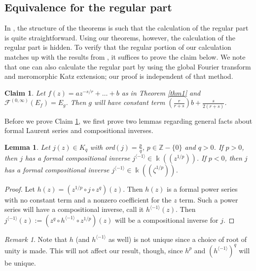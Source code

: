 \documentclass[11pt]{amsart}
\theoremstyle{plain}
\newtheorem{lemma}[theorem]{Lemma}
\newtheorem{claim}[theorem]{Claim}
\theoremstyle{definition}
\theoremstyle{remark}
\newtheorem*{remark}{Remark}
\def\d{\displaystyle}
\def\bigz{\mathbb{Z}}
\def\comp{\circ}
\begin{document}
\subsection{Equivalence for the regular part}\label{subsec equiv2}

In \cite{fang}, the structure of the theorems is such that the calculation of the regular part is quite straightforward.  Using our theorems, however, the calculation of the regular part is hidden. To verify that the regular portion of our calculation matches up with the results from \cite{fang}, it suffices to prove the claim below.  We note that one can also calculate the regular part by using the global Fourier transform and meromorphic Katz extension; our proof is independent of that method.

\begin{claim}\label{claim}
	Let $f(z)=az^{-s/r}+\dots+b$ as in Theorem \ref{thm1} and $\mathcal{F}^{(0, \infty)}(E_f) = E_g$. Then $g$ will have constant term $\d{\left(\frac{r}{r+s}\right)b+\frac{s}{2(r+s)}}$.
\end{claim}

Before we prove Claim \ref{claim}, we first prove two lemmas regarding general facts about formal Laurent series and compositional inverses.

\begin{lemma}\label{Laurinv}
  Let $j(z)\in K_q$ with ord$(j)=\frac{p}{q}$, $p\in \bigz -\{0\}$ and $q>0$.  If $p>0$, then $j$ has a  formal compositional inverse $j^{\langle -1 \rangle}\in\Bbbk((z^{1/p}))$.   If $p<0$, then $j$ has a formal compositional inverse $j^{\langle -1 \rangle}\in\Bbbk((\zeta^{1/p}))$.
\end{lemma}

\begin{proof}
	Let  $h(z) = (z^{1/p}\comp j\comp z^q)(z)$.  Then $h(z)$ is a formal power series with no constant term and a nonzero coefficient for the $z$ term.  Such a power series will have a compositional inverse, call it $h^{\langle -1 \rangle}(z)$.  Then $j^{\langle -1 \rangle}(z):=(z^q\comp h^{\langle -1 \rangle}\comp z^{1/p})(z)$ will be a compositional inverse for $j$.
\end{proof}

\begin{remark}  Note that $h$ (and $h^{\langle -1 \rangle}$ as well) is not unique  since a choice of root of unity is made.  This will not affect our result, though, since $h^p$ and $(h^{\langle -1 \rangle})^q$ will be unique.
\end{remark}
\end{document}
